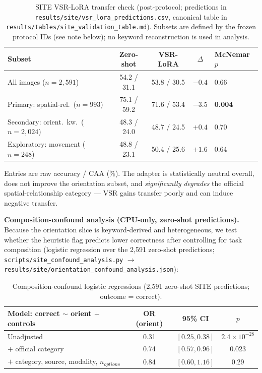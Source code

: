\begin{table}[h]
\centering
\footnotesize
\caption{SITE VSR-LoRA transfer check (post-protocol; predictions in
\texttt{results/site/vsr\_lora\_predictions.csv}, canonical table in
\texttt{results/tables/site\_validation\_table.md}). Subsets are defined by the
frozen protocol IDs (see note below); no keyword reconstruction is used in
analysis.}
\label{tab:site-transfer}
\begin{tabular}{lcccl}
\toprule
Subset & Zero-shot & VSR-LoRA & $\Delta$ & McNemar $p$ \\
\midrule
All images ($n{=}2{,}591$) & 54.2 / 31.1 & 53.8 / 30.5 & $-0.4$ & 0.66 \\
Primary: spatial-rel.\ ($n{=}993$) & 75.1 / 59.2 & 71.6 / 53.4 & $-3.5$ & \textbf{0.004} \\
Secondary: orient.\ kw.\ ($n{=}2{,}024$) & 48.3 / 24.0 & 48.7 / 24.5 & $+0.4$ & 0.70 \\
Exploratory: movement ($n{=}248$) & 48.8 / 23.1 & 50.4 / 25.6 & $+1.6$ & 0.64 \\
\bottomrule
\end{tabular}
\end{table}
Entries are raw accuracy / CAA (\%). The adapter is statistically neutral
overall, does not improve the orientation subset, and \emph{significantly
degrades} the official spatial-relationship category --- VSR gains transfer
poorly and can induce negative transfer.

\textbf{Composition-confound analysis (CPU-only, zero-shot predictions).}
Because the orientation slice is keyword-derived and heterogeneous, we test
whether the heuristic flag predicts lower correctness after controlling for
task composition (logistic regression over the 2,591 zero-shot predictions;
\texttt{scripts/site\_confound\_analysis.py} $\rightarrow$
\texttt{results/site/orientation\_confound\_analysis.json}):

\begin{table}[h]
\centering
\footnotesize
\caption{Composition-confound logistic regressions (2,591 zero-shot SITE
predictions; outcome = correct).}
\label{tab:confound}
\begin{tabular}{lccc}
\toprule
Model: correct $\sim$ orient $+$ controls & OR (orient) & 95\% CI & $p$ \\
\midrule
Unadjusted & 0.31 & $[0.25, 0.38]$ & $2.4\times10^{-28}$ \\
$+$ official category & 0.74 & $[0.57, 0.96]$ & 0.023 \\
$+$ category, source, modality, $n_{options}$ & 0.84 & $[0.60, 1.16]$ & 0.29 \\
\bottomrule
\end{tabular}
\end{table}

